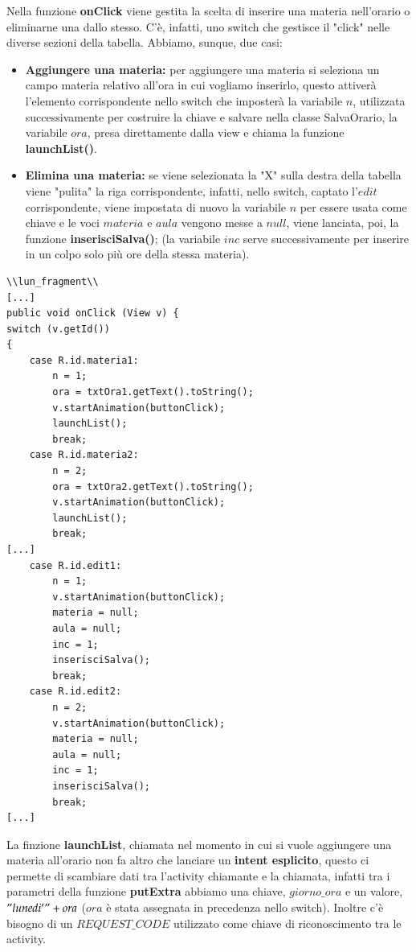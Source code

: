 \documentclass[a4paper, 50pt, twoside]{article}
\begin{document}
Nella funzione \textbf{onClick} viene gestita la scelta di inserire una materia nell'orario o eliminarne una dallo stesso. C'è, infatti, uno switch che gestisce il "click" nelle diverse sezioni della tabella. Abbiamo, sunque, due casi:
\begin{itemize}
\item \textbf{Aggiungere una materia:} per aggiungere una materia si seleziona un campo materia relativo all'ora in cui vogliamo inserirlo, questo attiverà l'elemento corrispondente nello switch che imposterà la variabile $n$, utilizzata successivamente per costruire la chiave e salvare nella classe SalvaOrario, la variabile $ora$, presa direttamente dalla view e chiama la funzione \textbf{launchList()}.
\item \textbf{Elimina una materia:} se viene selezionata la "X" sulla destra della tabella viene "pulita" la riga corrispondente, infatti, nello switch, captato l'$edit$ corrispondente, viene impostata di nuovo la variabile $n$ per essere usata come chiave e le voci $materia$ e $aula$ vengono messe a $null$, viene lanciata, poi, la funzione \textbf{inserisciSalva()}; (la variabile $inc$ serve successivamente per inserire in un colpo solo più ore della stessa materia).
\end{itemize}

\begin{lstlisting}
\\lun_fragment\\
[...]
public void onClick (View v) {
switch (v.getId())
{
	case R.id.materia1:
		n = 1;
		ora = txtOra1.getText().toString();
		v.startAnimation(buttonClick);
		launchList();
		break;
	case R.id.materia2:
		n = 2;
		ora = txtOra2.getText().toString();
		v.startAnimation(buttonClick);
		launchList();
		break;
[...]
	case R.id.edit1:
		n = 1;
		v.startAnimation(buttonClick);
		materia = null;
		aula = null;
		inc = 1;
		inserisciSalva();
		break;
	case R.id.edit2:
		n = 2;
		v.startAnimation(buttonClick);
		materia = null;
		aula = null;
		inc = 1;
		inserisciSalva();
		break;
[...]
\end{lstlisting}

La finzione \textbf{launchList}, chiamata nel momento in cui si vuole aggiungere una materia all'orario non fa altro che lanciare un \textbf{intent esplicito}, questo ci permette di scambiare dati tra l'activity chiamante e la chiamata, infatti tra i parametri della funzione \textbf{putExtra} abbiamo una chiave, $giorno\_ora$ e un valore, $"lunedi'" + ora$ ($ora$ è stata assegnata in precedenza nello switch). Inoltre c'è bisogno di un $REQUEST\_CODE$ utilizzato come chiave di riconoscimento tra le activity.
\end{document}
